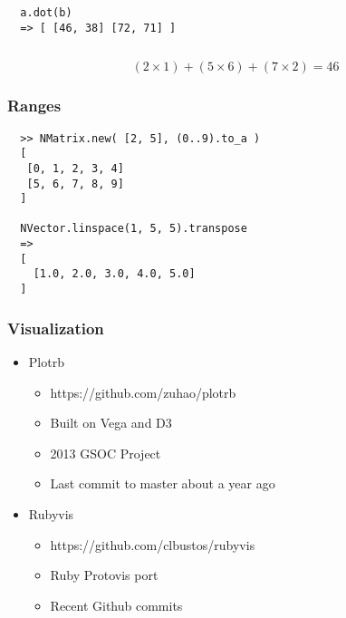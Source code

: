 \documentclass[10pt]{beamer}
\begin{document}
\begin{frame}[fragile]
\begin{columns}
\begin{column}{0.45\textwidth}
\begin{snugshade}
\begin{verbatim}
  a.dot(b)
  => [ [46, 38] [72, 71] ]
  \end{verbatim}
  \end{snugshade}

    \end{column}
  \end{columns}

  \vspace{5mm}
  \begin{snugshade}
  \[ (2 \times 1) + (5 \times 6) + (7 \times 2) = 46 \]
  \end{snugshade}
\end{frame}

\begin{frame}[fragile]
  \frametitle{Ranges}

  \begin{verbatim}
  >> NMatrix.new( [2, 5], (0..9).to_a )
  [
   [0, 1, 2, 3, 4]
   [5, 6, 7, 8, 9]
  ]

  NVector.linspace(1, 5, 5).transpose
  =>
  [
    [1.0, 2.0, 3.0, 4.0, 5.0]
  ]

  \end{verbatim}
\end{frame}


\begin{frame}
  \frametitle{Visualization}
  \begin{itemize}
    \item Plotrb
      \begin{itemize}
          \item https://github.com/zuhao/plotrb
          \item Built on Vega and D3
          \item 2013 GSOC Project
          \item Last commit to master about a year ago
      \end{itemize}
    \item Rubyvis
      \begin{itemize}
          \item https://github.com/clbustos/rubyvis
          \item Ruby Protovis port
          \item Recent Github commits
      \end{itemize}
  \end{itemize}
\end{frame}
\end{document}
